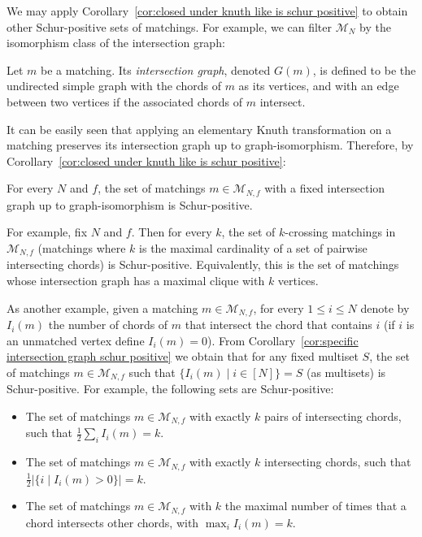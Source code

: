\documentclass[ALCO]{cedram}
\newcommand{\M}{\mathcal{M}}
\begin{document}
We may apply Corollary~\ref{cor:closed under knuth like is schur positive} to obtain other Schur-positive sets of matchings.
For example, we can filter $\M_N$ by the isomorphism class of the intersection graph:
\begin{definition}
    Let $m$ be a matching. Its \emph{intersection graph}, denoted $G(m)$, is defined to be the undirected simple graph with the chords of $m$ as its vertices, and with an edge between two vertices if the associated chords of $m$ intersect.
\end{definition}

It can be easily seen that applying an elementary Knuth transformation on a matching preserves its intersection graph up to graph-isomorphism. Therefore, by Corollary~\ref{cor:closed under knuth like is schur positive}:

\begin{corollary}
\label{cor:specific intersection graph schur positive}
    For every $N$ and $f$, the set of matchings $m \in \M_{N,f}$ with a fixed intersection graph up to graph-isomorphism is Schur-positive.
\end{corollary}

For example, fix $N$ and $f$. Then for every $k$, the set of $k$-crossing matchings in $\M_{N,f}$ (\ie matchings where $k$ is the maximal cardinality of a set of pairwise intersecting chords) is Schur-positive. Equivalently, this is the set of matchings whose intersection graph has a maximal clique with $k$ vertices.

As another example, given a matching $m \in \M_{N,f}$, for every $1 \le i \le N$ denote by $I_i(m)$ the number of chords of $m$ that intersect the chord that contains $i$ (if $i$ is an unmatched vertex define $I_i(m)=0$). From Corollary~\ref{cor:specific intersection graph schur positive} we obtain that for any fixed multiset $S$, the set of matchings $m \in \M_{N,f}$ such that $\{I_i(m) \mid i \in [N]\} = S$ (as multisets) is Schur-positive. For example, the following sets are Schur-positive:
\begin{itemize}
    \item The set of matchings $m \in \M_{N,f}$ with exactly $k$ pairs of intersecting chords, \ie such that $\frac{1}{2} \sum_i I_i(m) = k$.
    \item The set of matchings $m \in \M_{N,f}$ with exactly $k$ intersecting chords, \ie such that $\frac{1}{2} |\{i \mid I_i(m)>0 \}| = k$.
    \item The set of matchings $m \in \M_{N,f}$ with $k$ the maximal number of times that a chord intersects other chords, \ie with $\max_i I_i(m) = k$.
\end{itemize}
\end{document}
